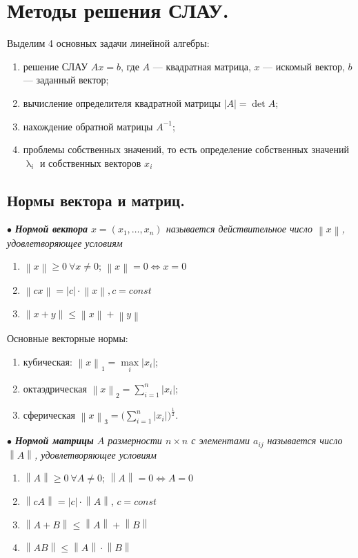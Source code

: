 \documentclass[a4paper, 12pt]{report}
\renewcommand{\lambda}{\uplambda}
\newcommand\Norm[1]{\left\| #1 \right\|}
\begin{document}
	\chapter{Методы решения СЛАУ.}
	Выделим 4 основных задачи линейной алгебры:
	\begin{enumerate}
		\item решение СЛАУ $Ax = b$, где $A$ --- квадратная матрица, $x$ --- искомый вектор, $b$ --- заданный вектор;
		\item вычисление определителя квадратной матрицы $|A| = \det A$;
		\item нахождение обратной матрицы $A^{-1}$;
		\item проблемы собственных значений, то есть определение собственных значений $\lambda_i$ и собственных векторов $x_i$
	\end{enumerate}
	\section{Нормы вектора и матриц.}
	$\bullet$ \textit{\textbf{Нормой вектора} $x = (x_1,\ldots, x_n)$ называется действительное число $\Norm{x}$, удовлетворяющее условиям}
	\begin{enumerate}
		\item $\left \|x\right \| \geqslant 0\ \forall x \ne0$; $\left \|x\right \| = 0 \Leftrightarrow x = 0$
		\item $\left \|c x\right \|=|c|\cdot\left \|x\right \|, c = const$
		\item  $\left \|x+y\right \| \leqslant \left \|x\right \| + \left \|y\right \|$
	\end{enumerate}
	Основные векторные нормы:
	\begin{enumerate}
		\item кубическая: $\Norm{x}_1 = \underset{i}{\max}|x_i|$;
		\item октаэдрическая $\Norm{x}_{2} = \sum_{i=1}^{n} | x_i|$;
		\item сферическая $\Norm{x}_{3} = \Big(\sum_{i=1}^{n}|x_i|\Big)^{\frac12}$.
	\end{enumerate}
	$\bullet$ \textit{\textbf{Нормой матрицы} $A$ размерности $n\times n$ с элементами $a_{ij}$ называется число $\Norm{A}$, удовлетворяющее условиям}
	\begin{enumerate}
		\item $\left \|A\right \| \geqslant 0\ \forall A\ne 0$; $\left \|A\right \| = 0 \Leftrightarrow A = 0$
		\item $\left \|c A\right \|=|c|\cdot\left \|A\right \|$, $c = const$
		\item  $\left \|A+B\right \| \leqslant \left \|A\right \| + \left \|B\right \|$
		\item $\left \|AB\right \| \leqslant \left \|A\right \|\cdot  \left \|B\right \|$
	\end{enumerate}
\end{document}
